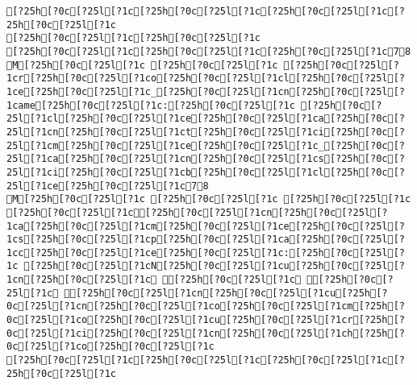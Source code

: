 \documentclass{scrartcl}
\begin{document}
\begin{Verbatim}
[?25h[?0c[?25l[?1c[?25h[?0c[?25l[?1c[?25h[?0c[?25l[?1c[?25h[?0c[?25l[?1c
[?25h[?0c[?25l[?1c[?25h[?0c[?25l[?1c
[?25h[?0c[?25l[?1c[?25h[?0c[?25l[?1c[?25h[?0c[?25l[?1c78
M[?25h[?0c[?25l[?1c [?25h[?0c[?25l[?1c [?25h[?0c[?25l[?1cr[?25h[?0c[?25l[?1co[?25h[?0c[?25l[?1cl[?25h[?0c[?25l[?1ce[?25h[?0c[?25l[?1c_[?25h[?0c[?25l[?1cn[?25h[?0c[?25l[?1came[?25h[?0c[?25l[?1c:[?25h[?0c[?25l[?1c [?25h[?0c[?25l[?1cl[?25h[?0c[?25l[?1ce[?25h[?0c[?25l[?1ca[?25h[?0c[?25l[?1cn[?25h[?0c[?25l[?1ct[?25h[?0c[?25l[?1ci[?25h[?0c[?25l[?1cm[?25h[?0c[?25l[?1ce[?25h[?0c[?25l[?1c_[?25h[?0c[?25l[?1ca[?25h[?0c[?25l[?1cn[?25h[?0c[?25l[?1cs[?25h[?0c[?25l[?1ci[?25h[?0c[?25l[?1cb[?25h[?0c[?25l[?1cl[?25h[?0c[?25l[?1ce[?25h[?0c[?25l[?1c78
M[?25h[?0c[?25l[?1c [?25h[?0c[?25l[?1c [?25h[?0c[?25l[?1c [?25h[?0c[?25l[?1c[?25h[?0c[?25l[?1cn[?25h[?0c[?25l[?1ca[?25h[?0c[?25l[?1cm[?25h[?0c[?25l[?1ce[?25h[?0c[?25l[?1cs[?25h[?0c[?25l[?1cp[?25h[?0c[?25l[?1ca[?25h[?0c[?25l[?1cc[?25h[?0c[?25l[?1ce[?25h[?0c[?25l[?1c:[?25h[?0c[?25l[?1c [?25h[?0c[?25l[?1cN[?25h[?0c[?25l[?1cu[?25h[?0c[?25l[?1cn[?25h[?0c[?25l[?1c [?25h[?0c[?25l[?1c [?25h[?0c[?25l[?1c [?25h[?0c[?25l[?1cn[?25h[?0c[?25l[?1cu[?25h[?0c[?25l[?1cn[?25h[?0c[?25l[?1co[?25h[?0c[?25l[?1cm[?25h[?0c[?25l[?1co[?25h[?0c[?25l[?1cu[?25h[?0c[?25l[?1cr[?25h[?0c[?25l[?1ci[?25h[?0c[?25l[?1cn[?25h[?0c[?25l[?1ch[?25h[?0c[?25l[?1co[?25h[?0c[?25l[?1c
[?25h[?0c[?25l[?1c[?25h[?0c[?25l[?1c[?25h[?0c[?25l[?1c[?25h[?0c[?25l[?1c

\end{Verbatim}
\end{document}
